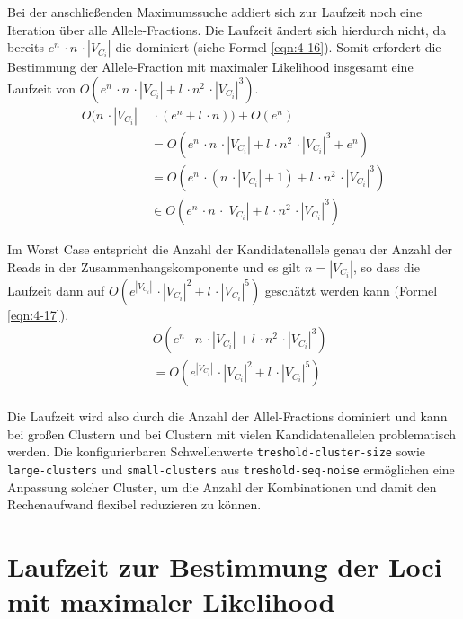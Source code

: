 Bei der anschließenden Maximumssuche addiert sich zur Laufzeit noch eine Iteration über alle Allele-Fractions. Die Laufzeit ändert sich hierdurch nicht, da bereits $e^n\, \cdotp n\, \cdotp |V_{C_{i}}|$ die dominiert (siehe Formel \eqref{eqn:4-16}). Somit erfordert die Bestimmung der Allele-Fraction mit maximaler Likelihood insgesamt eine Laufzeit von $ O( e^n\, \cdotp n\, \cdotp |V_{C_{i}}| + l\, \cdotp n^2\, \cdotp |V_{C_{i}}|^3) $.
\begin{equation} \label{eqn:4-16}
\tag{4-16}
\begin{aligned}
 O( n \, \cdotp |V_{C_{i}}| &\ {} \,\cdotp (e^n + l \, \cdotp n)) + O(e^n) \\
&\ = O( e^n \, \cdotp n \, \cdotp |V_{C_{i}}| + l \, \cdotp n^2 \, \cdotp |V_{C_{i}}|^3 + e^n)\\
&\ = O( e^n \,\cdotp ( n \, \cdotp |V_{C_{i}}| + 1) + l \, \cdotp n^2 \, \cdotp |V_{C_{i}}|^3) \\
& \ \in O( e^n \, \cdotp n\, \cdotp |V_{C_{i}}| + l\, \cdotp n^2\, \cdotp |V_{C_{i}}|^3) 
\end{aligned}
\end{equation}

Im Worst Case entspricht die Anzahl der Kandidatenallele genau der Anzahl der Reads in der Zusammenhangskomponente und es gilt $ n = |V_{C_{i}}| $, so dass die Laufzeit dann auf $  O( e^{|V_{C_{i}}|} \, \cdotp  |V_{C_{i}}|^2 + l \, \cdotp |V_{C_{i}}|^5) $ geschätzt werden kann (Formel \eqref{eqn:4-17}).
\begin{equation} \label{eqn:4-17}
\tag{4-17}
\begin{aligned}
&\ {} O( e^n\, \cdotp n \, \cdotp |V_{C_{i}}| + l \, \cdotp n^2 \, \cdotp |V_{C_{i}}|^3) \\
&\ {} = O( e^{|V_{C_{i}}|} \, \cdotp  |V_{C_{i}}|^2 + l \, \cdotp |V_{C_{i}}|^5)\\
\end{aligned}
\end{equation}

Die Laufzeit wird also durch die Anzahl der Allel-Fractions dominiert und kann bei großen Clustern und bei Clustern mit vielen Kandidatenallelen problematisch werden. Die konfigurierbaren Schwellenwerte \lstinline|treshold-cluster-size| sowie \lstinline|large-clusters| und \lstinline|small-clusters| aus \lstinline|treshold-seq-noise| ermöglichen eine Anpassung solcher Cluster, um die Anzahl der Kombinationen und damit den Rechenaufwand flexibel reduzieren zu können.


\section[Laufzeit der Loci-Zuordnung]{Laufzeit zur Bestimmung der Loci mit maximaler Likelihood}

